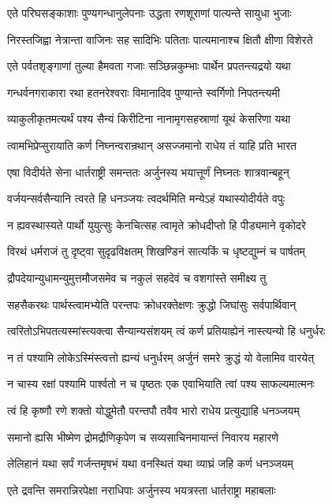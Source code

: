 \twolineshloka
{एते परिघसङ्काशाः पुण्यगन्धानुलेपनाः}
{उद्धता रणशूराणां पात्यन्ते सायुधा भुजाः}


\twolineshloka
{निरस्तजिह्वा नेत्रान्ता वाजिनः सह सादिभिः}
{पतिताः पात्यमानाश्च क्षितौ क्षीणा विशेरते}


\twolineshloka
{एते पर्वतशृङ्गाणां तुल्या हैमवता गजाः}
{सञ्छिन्नकुम्भाः पार्थेन प्रपतन्त्यद्रयो यथा}


\twolineshloka
{गन्धर्वनगराकारा रथा हतनरेश्वराः}
{विमानादिव पुण्यान्ते स्वर्गिणो निपतन्त्यमी}


\twolineshloka
{व्याकुलीकृतमत्यर्थं पश्य सैन्यं किरीटिना}
{नानामृगसहस्राणां यूथं केसरिणा यथा}


\twolineshloka
{त्वामभिप्रेप्सुरायाति कर्ण निघ्नन्वरान्रथान्}
{असज्जमानो राधेय तं याहि प्रति भारत}


\twolineshloka
{एषा विदीर्यते सेना धार्तराष्ट्री समन्ततः}
{अर्जुनस्य भयात्तूर्णं निघ्नतः शात्रवान्बहून्}


\twolineshloka
{वर्जयन्सर्वसैन्यानि त्वरते हि धनञ्जयः}
{त्वदर्थमिति मन्येऽहं यथास्योदीर्यते वपुः}


\twolineshloka
{न ह्यवस्थास्यते पार्थो युयुत्सुः केनचित्सह}
{त्वामृते क्रोधदीप्तो हि पीड्यमाने वृकोदरे}


\twolineshloka
{विरथं धर्मराजं तु दृष्ट्वा सुदृढविक्षतम्}
{शिखण्डिनं सात्यकिं च धृष्टद्युम्नं च पार्षतम्}


\twolineshloka
{द्रौपदेयान्युधामन्युमुत्तमौजसमेव च}
{नकुलं सहदेवं च वशगांस्ते समीक्ष्य तु}


\twolineshloka
{सहसैकरथः पार्थस्त्वामभ्येति परन्तपः}
{क्रोधरक्तेक्षणः क्रुद्धो जिघांसुः सर्वपार्थिवान्}


\twolineshloka
{त्वरितोऽभिपतत्यस्मांस्त्यक्त्वा सैन्यान्यसंशयम्}
{त्वं कर्ण प्रतियाह्येनं नास्त्यन्यो हि धनुर्धरः}


\twolineshloka
{न तं पश्यामि लोकेऽस्मिंस्त्वत्तो ह्यन्यं धनुर्धरम्}
{अर्जुनं समरे क्रुद्धं यो वेलामिव वारयेत्}


\twolineshloka
{न चास्य रक्षां पश्यामि पार्श्वतो न च पृष्ठतः}
{एक एवाभियाति त्वां पश्य साफल्यमात्मनः}


\twolineshloka
{त्वं हि कृष्णौ रणे शक्तो योद्धुमेतौ परन्तपौ}
{तवैव भारो राधेय प्रत्युद्याहि धनञ्जयम्}


\twolineshloka
{समानो ह्यसि भीष्मेण द्रोमद्रौणिकृपेण च}
{सव्यसाचिनमायान्तं निवारय महारणे}


\twolineshloka
{लेलिहानं यथा सर्पं गर्जन्तमृषभं यथा}
{वनस्थितं यथा व्याघ्रं जहि कर्ण धनञ्जयम्}


\twolineshloka
{एते द्रवन्ति समरान्निरपेक्षा नराधिपाः}
{अर्जुनस्य भयत्रस्ता धार्तराष्ट्रा महाबलाः}


